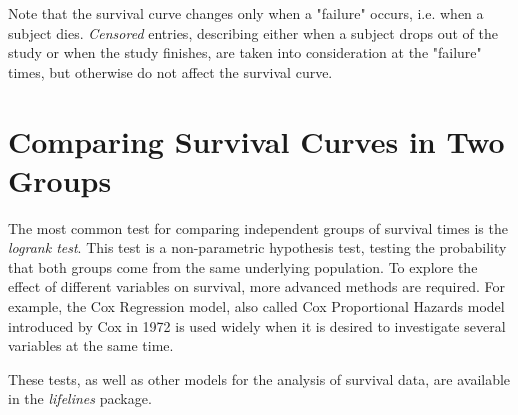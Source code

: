 Note that the survival curve changes only when a "failure" occurs, i.e. when a subject dies. \emph{Censored} entries, describing either when a subject drops out of the study or when the study finishes, are taken into consideration at the "failure" times, but otherwise do not affect the survival curve.

\section{Comparing Survival Curves in Two Groups} 

The most common test for comparing independent groups of survival times is the \emph{logrank test}. This test is a non-parametric hypothesis test, testing the probability that both groups come from the same underlying population. To explore the effect of different variables on survival, more advanced methods are required. For example, the Cox Regression model, also called Cox Proportional Hazards model introduced by Cox in 1972 is used widely when it is desired to investigate several variables at the same time.

These tests, as well as other models for the analysis of survival data, are available in the \emph{lifelines} package. 